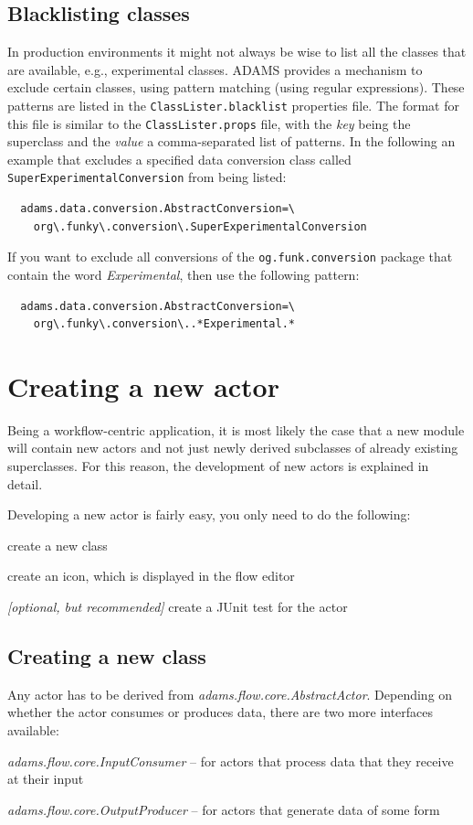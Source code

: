 \subsection{Blacklisting classes}
In production environments it might not always be wise to list all the classes
that are available, e.g., experimental classes. ADAMS provides a mechanism to
exclude certain classes, using pattern matching (using regular expressions).
These patterns are listed in the \texttt{ClassLister.blacklist} properties file.
The format for this file is similar to the \texttt{ClassLister.props} file, with
the \textit{key} being the superclass and the \textit{value} a comma-separated
list of patterns. In the following an example that excludes a specified data
conversion class called \texttt{SuperExperimentalConversion} from being listed:
\begin{verbatim}
  adams.data.conversion.AbstractConversion=\
    org\.funky\.conversion\.SuperExperimentalConversion
\end{verbatim}
If you want to exclude all conversions of the \texttt{og.funk.conversion}
package that contain the word \textit{Experimental}, then use the following
pattern:
\begin{verbatim}
  adams.data.conversion.AbstractConversion=\
    org\.funky\.conversion\..*Experimental.*
\end{verbatim}

\section{Creating a new actor}
Being a workflow-centric application, it is most likely the case that a new
module will contain new actors and not just newly derived subclasses of already
existing superclasses. For this reason, the development of new actors is
explained in detail.

Developing a new actor is fairly easy, you only need to do the following:
\begin{tight_itemize}
	\item create a new class
	\item create an icon, which is displayed in the flow editor
	\item \textit{[optional, but recommended]} create a JUnit test for the actor
\end{tight_itemize}

\subsection{Creating a new class}
Any actor has to be derived from \textit{adams.flow.core.AbstractActor}.
Depending on whether the actor consumes or produces data, there are two more
interfaces available:
\begin{tight_itemize}
	\item \textit{adams.flow.core.InputConsumer} -- for actors that process data
	that they receive at their input
	\item \textit{adams.flow.core.OutputProducer} -- for actors that generate data
	of some form
\end{tight_itemize}

